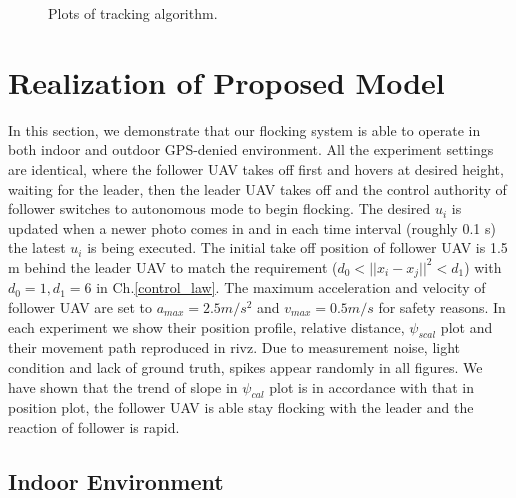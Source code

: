 \begin{figure}[H]
  \caption{Plots of tracking algorithm.}\label{fig:track_plot}
\end{figure}

\section{Realization of Proposed Model}

In this section, we demonstrate that our flocking system is able to operate in both indoor and outdoor GPS-denied environment. All the experiment settings are identical, where the follower UAV takes off first and hovers at desired height, waiting for the leader, then the leader UAV takes off and the control authority of follower switches to autonomous mode to begin flocking. The desired $u_i$ is updated when a newer photo comes in and in each time interval (roughly 0.1 s) the latest $u_i$ is being executed. The initial take off position of follower UAV is 1.5 m behind the leader UAV to match the requirement ($d_0<||x_i-x_j||^2<d_1$) with $d_0=1, d_1=6$ in Ch.\ref{control_law}. The maximum acceleration and velocity of follower UAV are set to $a_{max}=2.5 m/s^2$ and $v_{max}=0.5 m/s$ for safety reasons. In each experiment we show their position profile, relative distance, $\psi_{scal}$ plot and their movement path reproduced in rivz. Due to measurement noise, light condition and lack of ground truth, spikes appear randomly in all figures. We have shown that the trend of slope in $\psi_{cal}$ plot is in accordance with that in position plot, the follower UAV is able stay flocking with the leader and the reaction of follower is rapid.

\subsection{Indoor Environment}

